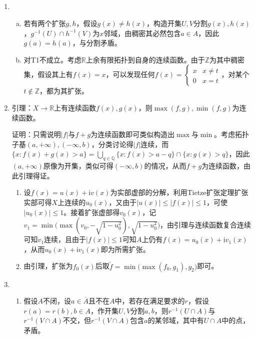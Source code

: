 \documentclass[a4paper,UTF8,fontset=windows]{ctexart}
\begin{document}
\subsection{}
\begin{enumerate}[(1)]
    \item
    \begin{enumerate}[(a)]
    \item
    若有两个扩张$g,h$，假设$g(x)\ne h(x)$，构造开集$U,V$分割$g(x),h(x)$，$g^{-1}(U)\cap h^{-1}(V)$为$x$邻域，由稠密其必然包含$a\in A$，因此$g(a)=h(a)$，与分割矛盾。
    
    \item
    对T1不成立。考虑$\mathbb{R}$上余有限拓扑到自身的连续函数。由于$\mathbb{Z}$为其中稠密集，假设其上有$f(x)=x$，可以发现任何$f(x)=\begin{cases}x&x\ne t\\0&x=t\end{cases}$，对某个$t\notin\mathbb{Z}$，都为其扩张。
    \end{enumerate}
    
    \item
    引理：$X\to\mathbb{R}$上有连续函数$f(x),g(x)$，则$\max(f,g),\min(f,g)$为连续函数。
    
    证明：只需说明$|f|$与$f+g$为连续函数即可类似构造出$\max$与$\min$。考虑拓扑子基$(a,+\infty),(-\infty,b)$，分类讨论得$|f|$连续，而$\{x:f(x)+g(x)>a\}=\bigcup_{q\in\mathbb{Q}}\{x:f(x)>a-q\}\cap\{x:g(x)>q\}$，因此$(a,+\infty)$原像为开集，类似可得$(-\infty,b)$的情况，从而$f+g$为连续函数，由此引理得证。
    
    \begin{enumerate}
    \item
    设$f(x)=u(x)+\mathrm{i}v(x)$为实部虚部的分解，利用Tietze扩张定理扩张实部可得$X$上连续的$u_0(x)$，又由于$|u(x)|\le|f(x)|\le1$，可使$|u_0(x)|\le1$。接着扩张虚部得$v_0(x)$，记$v_1=\min\big(\max(v_0,-\sqrt{1-u_0^2}),\sqrt{1-u_0^2}\big)$，由引理与连续函数复合连续可知$v_1$连续，且由于$|f(x)|\le1$可知$A$上仍有$f(x)=u_0(x)+\mathrm{i}v_1(x)$，从而$u_0(x)+\mathrm{i}v_1(x)$即为所需扩张。
    
    \item
    由引理，扩张为$f_0(x)$后取$\tilde{f}=\min\big(\max(f_0,g_1),g_2\big)$即可。
    \end{enumerate}
    
    \item
    \begin{enumerate}
    \item
    假设$A$不闭，设$a\in\overline{A}$且不在$A$中，若存在满足要求的$r$，假设$r(a)=r(b),b\in A$，作开集$U,V$分割$a,b$，则$r^{-1}(U\cap A)$与$r^{-1}(V\cap A)$不交，但$r^{-1}(V\cap A)$包含$a$的某邻域，其中有$U\cap A$中的点，矛盾。
    

\end{enumerate}
\end{enumerate}
\end{document}
